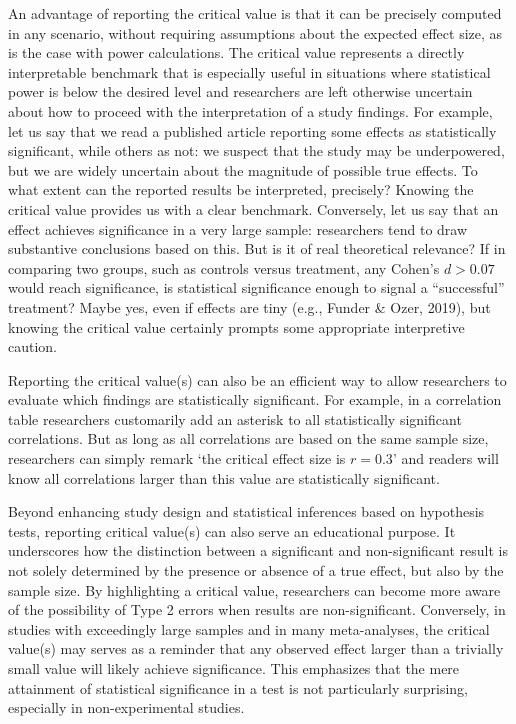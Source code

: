 \documentclass[
  man]{apa7}
\begin{document}
An advantage of reporting the critical value is that it can be precisely computed in any scenario, without requiring assumptions about the expected effect size, as is the case with power calculations. The critical value represents a directly interpretable benchmark that is especially useful in situations where statistical power is below the desired level and researchers are left otherwise uncertain about how to proceed with the interpretation of a study findings. For example, let us say that we read a published article reporting some effects as statistically significant, while others as not: we suspect that the study may be underpowered, but we are widely uncertain about the magnitude of possible true effects. To what extent can the reported results be interpreted, precisely? Knowing the critical value provides us with a clear benchmark. Conversely, let us say that an effect achieves significance in a very large sample: researchers tend to draw substantive conclusions based on this. But is it of real theoretical relevance? If in comparing two groups, such as controls versus treatment, any Cohen's \(d > 0.07\) would reach significance, is statistical significance enough to signal a ``successful'' treatment? Maybe yes, even if effects are tiny (e.g., Funder \& Ozer, 2019), but knowing the critical value certainly prompts some appropriate interpretive caution.

Reporting the critical value(s) can also be an efficient way to allow researchers to evaluate which findings are statistically significant. For example, in a correlation table researchers customarily add an asterisk to all statistically significant correlations. But as long as all correlations are based on the same sample size, researchers can simply remark `the critical effect size is \(r = 0.3\)' and readers will know all correlations larger than this value are statistically significant.

Beyond enhancing study design and statistical inferences based on hypothesis tests, reporting critical value(s) can also serve an educational purpose. It underscores how the distinction between a significant and non-significant result is not solely determined by the presence or absence of a true effect, but also by the sample size. By highlighting a critical value, researchers can become more aware of the possibility of Type 2 errors when results are non-significant. Conversely, in studies with exceedingly large samples and in many meta-analyses, the critical value(s) may serves as a reminder that any observed effect larger than a trivially small value will likely achieve significance. This emphasizes that the mere attainment of statistical significance in a test is not particularly surprising, especially in non-experimental studies.
\end{document}
